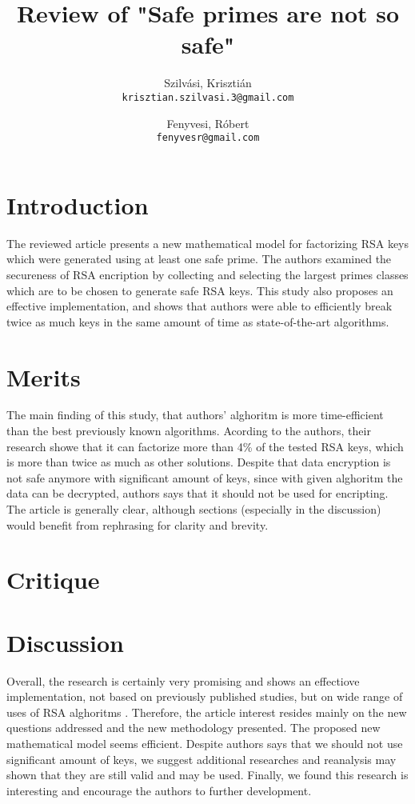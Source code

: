 \documentclass[11 pt,a4paper,english]{article}
\title{Review of "Safe primes are not so safe"}
\author{
	Szilvási, Krisztián\\
	\texttt{krisztian.szilvasi.3@gmail.com}
	\and
	Fenyvesi, Róbert\\
	\texttt{fenyvesr@gmail.com}
}
\begin{document}
\maketitle

\newpage

\section{Introduction}
The reviewed article \cite{safeprimes} presents a new mathematical model for factorizing RSA keys which were generated using at least one safe prime. 
The authors examined the secureness of RSA encription by collecting and selecting the largest primes classes which are to be chosen to generate safe RSA keys. 
This study also proposes an effective implementation, and shows that authors were able to efficiently break twice as much keys in the same amount of time as state-of-the-art algorithms. 


\section{Merits}
The main finding of this study, that authors' alghoritm is more time-efficient than the best previously known algorithms. Acording to the authors, their research showe that it can factorize more than 4\% of the tested RSA keys, which is more than twice as much as other solutions. 
Despite that data encryption is not safe anymore with significant amount of keys, since with given alghoritm the data can be decrypted, authors says that it should not be used for encripting. 
The article is generally clear, although sections (especially in the discussion) would benefit from rephrasing for clarity and brevity.


\section{Critique}



\section{Discussion}
Overall, the research is certainly very promising and shows an effectiove implementation, not based on previously published studies, but on wide range of uses of RSA alghoritms \cite{10.1145/359340.359342}.
Therefore, the article interest resides mainly on the new questions addressed and the new methodology presented. The proposed new mathematical model seems efficient. Despite authors says that we should not use significant amount of keys, we suggest additional researches and reanalysis may shown that they are still valid and may be used.
Finally, we found this research is interesting and encourage the authors to further development.




\newpage
{}

\end{document}
